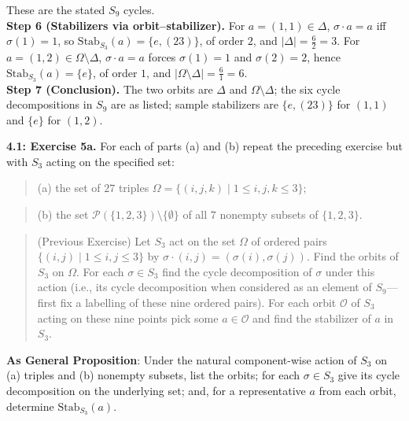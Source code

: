 \documentclass[11pt]{article}
\theoremstyle{definition}
\begin{document}
These are the stated $S_9$ cycles.\\
\textbf{Step 6 (Stabilizers via orbit–stabilizer).} For $a=(1,1)\in\Delta$, $\sigma\!\cdot\!a=a$ iff $\sigma(1)=1$, so $\mathrm{Stab}_{S_3}(a)=\{e,(23)\}$, of order $2$, and $|\Delta|=\frac{6}{2}=3$. For $a=(1,2)\in\Omega\setminus\Delta$, $\sigma\!\cdot\!a=a$ forces $\sigma(1)=1$ and $\sigma(2)=2$, hence $\mathrm{Stab}_{S_3}(a)=\{e\}$, of order $1$, and $|\Omega\setminus\Delta|=\frac{6}{1}=6$.\\
\textbf{Step 7 (Conclusion).} The two orbits are $\Delta$ and $\Omega\setminus\Delta$; the six cycle decompositions in $S_9$ are as listed; sample stabilizers are $\{e,(23)\}$ for $(1,1)$ and $\{e\}$ for $(1,2)$.\\

\newpage

\newpage

\noindent \textbf{4.1: Exercise 5a.} For each of parts (a) and (b) repeat the preceding exercise but with $S_3$ acting on the specified set:\\

\begin{quote}
(a) the set of $27$ triples $\Omega=\{(i,j,k)\mid 1\le i,j,k\le 3\}$;
\end{quote}

\begin{quote}
(b) the set $\mathcal P(\{1,2,3\})\setminus\{\emptyset\}$ of all $7$ nonempty subsets of $\{1,2,3\}$.
\end{quote} %

\begin{quote} 

(Previous Exercise) Let $S_3$ act on the set $\Omega$ of ordered pairs $\{(i,j)\mid 1\le i,j\le 3\}$ by $\sigma\!\cdot\!(i,j)=(\sigma(i),\sigma(j))$. Find the orbits of $S_3$ on $\Omega$. For each $\sigma\in S_3$ find the cycle decomposition of $\sigma$ under this action (i.e., its cycle decomposition when considered as an element of $S_9$—first fix a labelling of these nine ordered pairs). For each orbit $\mathcal O$ of $S_3$ acting on these nine points pick some $a\in\mathcal O$ and find the stabilizer of $a$ in $S_3$.\\ %

\end{quote}

\noindent\textbf{As General Proposition}: Under the natural component-wise action of $S_3$ on (a) triples and (b) nonempty subsets, list the orbits; for each $\sigma\in S_3$ give its cycle decomposition on the underlying set; and, for a representative $a$ from each orbit, determine $\mathrm{Stab}_{S_3}(a)$.\\
\end{document}
